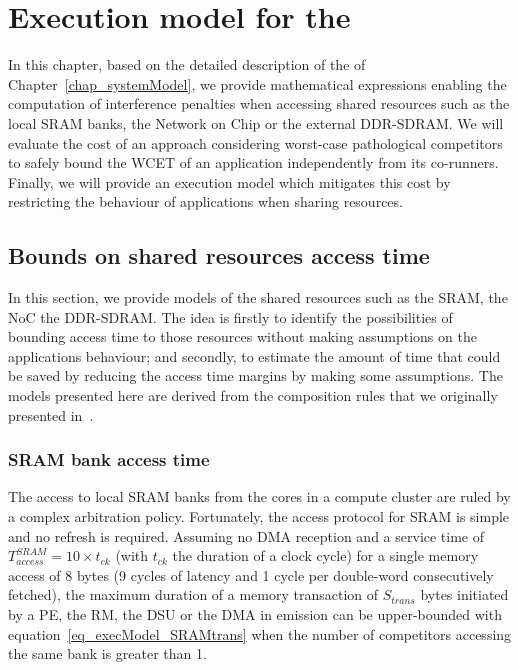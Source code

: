 \documentclass[main.tex]{subfiles}
\begin{document}
\chapter{Execution model for the \mppalong}
\thispagestyle{chapstyle}
\label{chap_execModel}
\minitoc





In this chapter, based on the detailed description of the \mppalong of Chapter~\ref{chap_systemModel}, we provide mathematical expressions enabling the computation of interference penalties when accessing shared resources such as the local SRAM banks, the Network on Chip or the external DDR-SDRAM. We will evaluate the cost of an approach considering worst-case pathological competitors to safely bound the WCET of an application independently from its co-runners. Finally, we will provide an execution model which mitigates this cost by restricting the behaviour of applications when sharing resources.


\section{Bounds on shared resources access time}
\label{sec_execModel_boundsSharedRes}

In this section, we provide models of the shared resources such as the SRAM, the NoC the DDR-SDRAM.
The idea is firstly to identify the possibilities of bounding access time to those resources without making assumptions on the applications behaviour; and secondly, to estimate the amount of time that could be saved by reducing the access time margins by making some assumptions. The models presented here are derived from the composition rules that we originally presented in~\cite{Perret16}.


\subsection{SRAM bank access time}
\label{ssec_execModel_SRAMaccessModel}
The access to local SRAM banks from the cores in a compute cluster are ruled by a complex arbitration policy.
Fortunately, the access protocol for SRAM is simple and no refresh is required. Assuming no DMA reception and a service time of $T_{access}^{SRAM} = 10 \times t_{ck}$ (with $t_{ck}$ the duration of a clock cycle) for a single memory access of 8 bytes (9 cycles of latency and 1 cycle per double-word consecutively fetched), the maximum duration of a memory transaction of $S_{trans}$ bytes initiated by a PE, the RM, the DSU or the DMA in emission can be upper-bounded with equation~\ref{eq_execModel_SRAMtrans} when the number of competitors accessing the same bank is greater than 1. 
\end{document}
